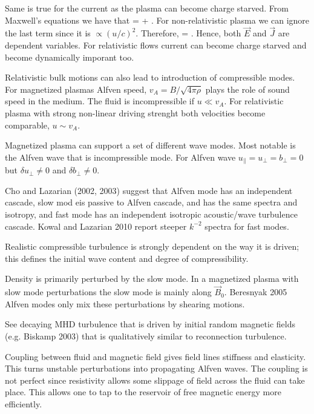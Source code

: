 \documentclass[usenatbib,twocolumn]{aastex63}
\begin{document}
Same is true for the current as the plasma can become charge starved.
From Maxwell's equations we have that
\be
\nabla \times {} =   +  .
\ee
For non-relativistic plasma we can ignore the last term since it is $\propto (u/c)^2$.
Therefore, 
\be
{} =  \nabla\times{}.
\ee
Hence, both $\vec{E}$ and $\vec{J}$ are dependent variables.
For relativistic flows current can become charge starved and become dynamically imporant too.

Relativistic bulk motions can also lead to introduction of compressible modes.
For magnetized plasmas Alfven speed, $v_A = B/\sqrt{4\pi\rho}$ plays the role of sound speed in the medium.
The fluid is incompressible if $u \ll v_A$.
For relativistic plasma with strong non-linear driving strenght both velocities become comparable, $u \sim v_A$.


Magnetized plasma can support a set of different wave modes.
Most notable is the Alfven wave that is incompressible mode.
For Alfven wave $u_\parallel = u_\perp = b_\perp = 0$ but $\delta u_\perp \ne 0$ and $\delta b_\perp \ne 0$.


Cho and Lazarian (2002, 2003) suggest that Alfven mode has an independent cascade, slow mod eis passive to Alfven cascade, and has the same spectra and isotropy, and fast mode has an independent isotropic acoustic/wave turbulence cascade.
Kowal and Lazarian 2010 report steeper $k^{-2}$ spectra for fast modes.

Realistic compressible turbulence is strongly dependent on the way it is driven;
this defines the initial wave content and degree of compressibility.

Density is primarily perturbed by the slow mode.
In a magnetized plasma with slow mode perturbations the slow mode is mainly along $\vec{B}_0$.
Beresnyak 2005
Alfven modes only mix these perturbations by shearing motions.

See decaying MHD turbulence that is driven by initial random magnetic fields (e.g. Biskamp 2003) that is qualitatively similar to reconnection turbulence.


Coupling between fluid and magnetic field gives field lines stiffness and elasticity.
This turns unstable perturbations into propagating Alfven waves.
The coupling is not perfect since resistivity allows some slippage of field across the fluid can take place.
This allows one to tap to the reservoir of free magnetic energy more efficiently.
\end{document}
